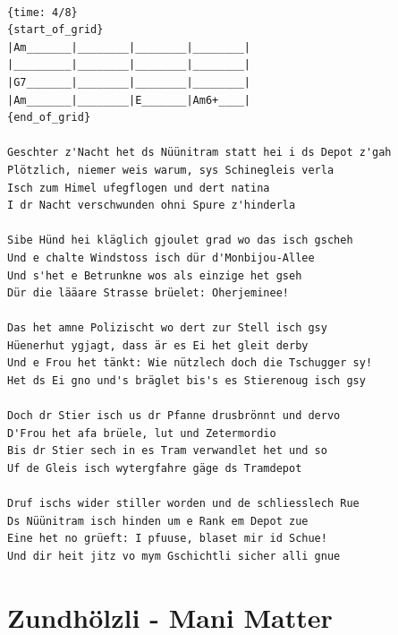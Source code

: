 \documentclass[]{book}
\let\stdsection\section
\renewcommand\section{\clearpage\stdsection}
\begin{document}
\begin{verbatim}

{time: 4/8}
{start_of_grid}
|Am_______|________|________|________|
|_________|________|________|________|
|G7_______|________|________|________|
|Am_______|________|E_______|Am6+____|
{end_of_grid}

Geschter z'Nacht het ds Nüünitram statt hei i ds Depot z'gah
Plötzlich, niemer weis warum, sys Schinegleis verla
Isch zum Himel ufegflogen und dert natina
I dr Nacht verschwunden ohni Spure z'hinderla

Sibe Hünd hei kläglich gjoulet grad wo das isch gscheh
Und e chalte Windstoss isch dür d'Monbijou-Allee
Und s'het e Betrunkne wos als einzige het gseh
Dür die lääare Strasse brüelet: Oherjeminee!

Das het amne Polizischt wo dert zur Stell isch gsy
Hüenerhut ygjagt, dass är es Ei het gleit derby
Und e Frou het tänkt: Wie nützlech doch die Tschugger sy!
Het ds Ei gno und's bräglet bis's es Stierenoug isch gsy

Doch dr Stier isch us dr Pfanne drusbrönnt und dervo
D'Frou het afa brüele, lut und Zetermordio
Bis dr Stier sech in es Tram verwandlet het und so
Uf de Gleis isch wytergfahre gäge ds Tramdepot

Druf ischs wider stiller worden und de schliesslech Rue
Ds Nüünitram isch hinden um e Rank em Depot zue
Eine het no grüeft: I pfuuse, blaset mir id Schue!
Und dir heit jitz vo mym Gschichtli sicher alli gnue

\end{verbatim}

\hypertarget{zundholzli---mani-matter}{%
\section{Zundhölzli - Mani Matter}\label{zundholzli---mani-matter}}
\end{document}
